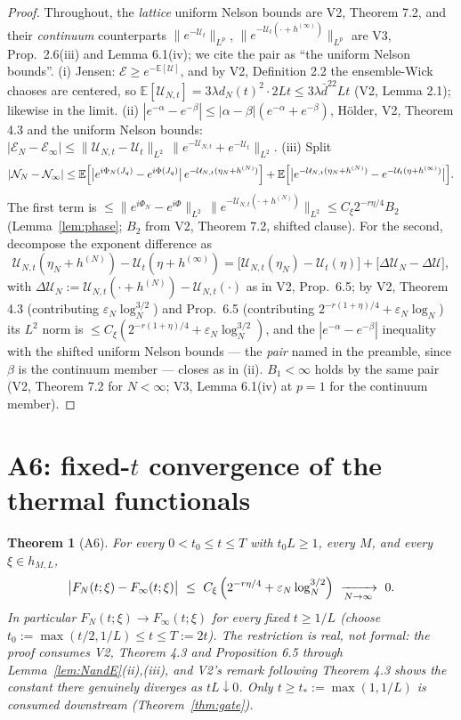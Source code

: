 \documentclass[11pt,a4paper]{article}
\theoremstyle{plain}
\newtheorem{theorem}{Theorem}[section]
\theoremstyle{definition}
\newcommand{\E}{\mathbb{E}}
\newcommand{\eps}{\varepsilon}
\newcommand{\U}{\mathcal U}
\newcommand{\logN}{\log_N}
\begin{document}
\begin{proof}
Throughout, the \emph{lattice} uniform Nelson bounds are V2, Theorem 7.2,
and their \emph{continuum} counterparts $\|e^{-\U_t}\|_{L^p}$,
$\|e^{-\U_t(\cdot+h^{(\infty)})}\|_{L^p}$ are V3, Prop.\ 2.6(iii) and
Lemma 6.1(iv); we cite the pair as ``the uniform Nelson bounds''.
(i) Jensen: $\mathcal E\ge e^{-\E[\U]}$, and by V2, Definition 2.2 the
ensemble-Wick chaoses are centered, so
$\E[\U_{N,t}]=3\lambda d_N(t)^2\cdot2Lt\le3\lambda\bar d^22Lt$ (V2,
Lemma 2.1); likewise in the limit.
(ii) $|e^{-\alpha}-e^{-\beta}|\le|\alpha-\beta|(e^{-\alpha}+e^{-\beta})$,
H\"older, V2, Theorem 4.3 and the uniform Nelson bounds:
$|\mathcal E_N-\mathcal E_\infty|\le\|\U_{N,t}-\U_t\|_{L^2}
\,\|e^{-\U_{N,t}}+e^{-\U_t}\|_{L^2}$.
(iii) Split
\[
 |\mathcal N_N-\mathcal N_\infty|
 \le\E\Bigl[\bigl|e^{i\Phi_N(J_q)}-e^{i\Phi(J_q)}\bigr|\,
 e^{-\U_{N,t}(\eta_N+h^{(N)})}\Bigr]
 +\E\Bigl[\bigl|e^{-\U_{N,t}(\eta_N+h^{(N)})}
 -e^{-\U_t(\eta+h^{(\infty)})}\bigr|\Bigr].
\]
The first term is $\le\|e^{i\Phi_N}-e^{i\Phi}\|_{L^2}\,
\|e^{-\U_{N,t}(\cdot+h^{(N)})}\|_{L^2}\le C_\xi2^{-r\eta/4}B_2$
(Lemma~\ref{lem:phase}; $B_2$ from V2, Theorem 7.2, shifted clause). For
the second, decompose the exponent difference as
\[
 \U_{N,t}(\eta_N+h^{(N)})-\U_t(\eta+h^{(\infty)})
 =\bigl[\U_{N,t}(\eta_N)-\U_t(\eta)\bigr]
 +\bigl[\Delta\U_N-\Delta\U\bigr],
\]
with $\Delta\U_N:=\U_{N,t}(\cdot+h^{(N)})-\U_{N,t}(\cdot)$ as in V2,
Prop.\ 6.5; by V2, Theorem 4.3 (contributing $\eps_N\logN^{3/2}$) and Prop.\ 6.5
(contributing $2^{-r(1+\eta)/4}+\eps_N\logN$) its $L^2$ norm is
$\le C_\xi(2^{-r(1+\eta)/4}+\eps_N\logN^{3/2})$, and the
$|e^{-\alpha}-e^{-\beta}|$ inequality with the shifted uniform Nelson
bounds --- the \emph{pair} named in the preamble, since $\beta$ is the
continuum member --- closes as in (ii). $B_1<\infty$ holds by the same pair
(V2, Theorem 7.2 for $N<\infty$; V3, Lemma 6.1(iv) at $p=1$ for the
continuum member).
\end{proof}

\section{A6: fixed-$t$ convergence of the thermal functionals}
\label{sec:A6}

\begin{theorem}[A6]\label{thm:A6}
For every $0<t_0\le t\le T$ with $t_0L\ge1$, every $M$, and every
$\xi\in h_{M,L}$,
\[
 \bigl|F_N(t;\xi)-F_\infty(t;\xi)\bigr|
 \ \le\ C_\xi\,\Bigl(2^{-r\eta/4}+\eps_N\logN^{3/2}\Bigr)
 \ \xrightarrow[N\to\infty]{}\ 0 .
\]
In particular $F_N(t;\xi)\to F_\infty(t;\xi)$ for every fixed $t\ge1/L$ (choose
$t_0:=\max(t/2,1/L)\le t\le T:=2t$). The restriction is real, not formal: the proof
consumes V2, Theorem 4.3 and Proposition 6.5 through Lemma~\ref{lem:NandE}(ii),(iii),
and V2's remark following Theorem 4.3 shows the constant there genuinely diverges as
$tL\downarrow0$. Only $t\ge t_*:=\max(1,1/L)$ is consumed downstream
(Theorem~\ref{thm:gate}).
\end{theorem}
\end{document}
